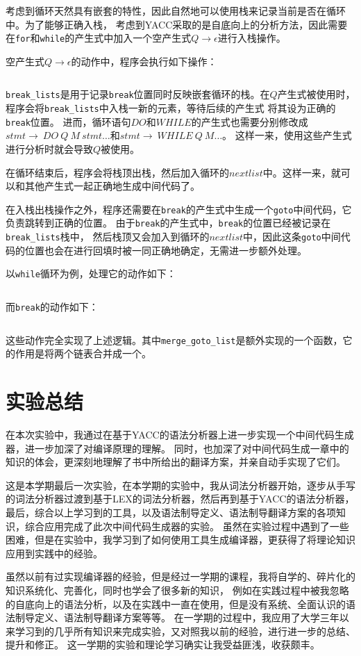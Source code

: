 \documentclass[a4paper,twoside]{article}
\begin{document}
\begin{spacing}{1.2}
考虑到循环天然具有嵌套的特性，因此自然地可以使用栈来记录当前是否在循环中。为了能够正确入栈，
考虑到YACC采取的是自底向上的分析方法，因此需要在\texttt{for}和\texttt{while}的产生式中加入一个空产生式$Q\rightarrow\epsilon$进行入栈操作。

空产生式$Q\rightarrow\epsilon$的动作中，程序会执行如下操作：
\inputminted[firstline=90,lastline=91]{c}{../code/grammar.y}
\texttt{break\_lists}是用于记录\texttt{break}位置同时反映嵌套循环的栈。在$Q$产生式被使用时，程序会将\texttt{break\_lists}中入栈一新的元素，等待后续的产生式
将其设为正确的\texttt{break}位置。
进而，循环语句$DO$和$WHILE$的产生式也需要分别修改成$stmt\rightarrow \ DO \ Q \ M \ stmt \ldots$和$stmt\rightarrow \ WHILE \ Q \ M \ldots$。
这样一来，使用这些产生式进行分析时就会导致$Q$被使用。

在循环结束后，程序会将栈顶出栈，然后加入循环的$nextlist$中。这样一来，就可以和其他产生式一起正确地生成中间代码了。

在入栈出栈操作之外，程序还需要在\texttt{break}的产生式中生成一个\texttt{goto}中间代码，它负责跳转到正确的位置。
由于\texttt{break}的产生式中，\texttt{break}的位置已经被记录在\texttt{break\_lists}栈中，
然后栈顶又会加入到循环的$nextlist$中，因此这条\texttt{goto}中间代码的位置也会在进行回填时被一同正确地确定，无需进一步额外处理。

以\texttt{while}循环为例，处理它的动作如下：
\inputminted[firstline=118,lastline=124]{c}{../code/grammar.y}
而\texttt{break}的动作如下：
\inputminted[firstline=131,lastline=141]{c}{../code/grammar.y}
这些动作完全实现了上述逻辑。其中\texttt{merge\_goto\_list}是额外实现的一个函数，它的作用是将两个链表合并成一个。


\section{实验总结}

在本次实验中，我通过在基于YACC的语法分析器上进一步实现一个中间代码生成器，进一步加深了对编译原理的理解。
同时，也加深了对中间代码生成一章中的知识的体会，更深刻地理解了书中所给出的翻译方案，并亲自动手实现了它们。

这是本学期最后一次实验，在本学期的实验中，我从词法分析器开始，逐步从手写的词法分析器过渡到基于LEX的词法分析器，然后再到基于YACC的语法分析器，
最后，综合以上学习到的工具，以及语法制导定义、语法制导翻译方案的各项知识，综合应用完成了此次中间代码生成器的实验。
虽然在实验过程中遇到了一些困难，但是在实验中，我学习到了如何使用工具生成编译器，更获得了将理论知识应用到实践中的经验。

虽然以前有过实现编译器的经验，但是经过一学期的课程，我将自学的、碎片化的知识系统化、完善化，同时也学会了很多新的知识，
例如在实践过程中被我忽略的自底向上的语法分析，以及在实践中一直在使用，但是没有系统、全面认识的语法制导定义、语法制导翻译方案等等。
在一学期的过程中，我应用了大学三年以来学习到的几乎所有知识来完成实验，又对照我以前的经验，进行进一步的总结、提升和修正。
这一学期的实验和理论学习确实让我受益匪浅，收获颇丰。


\end{spacing}
\end{document}
